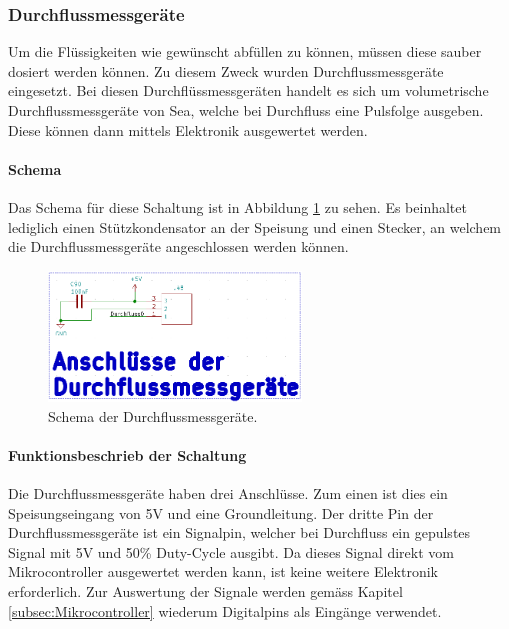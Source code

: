 \subsubsection{Durchflussmessgeräte}
\label{subsubsec:Durchflussmessgeraete}

Um die Flüssigkeiten wie gewünscht abfüllen zu können, müssen diese sauber dosiert werden können. Zu diesem Zweck wurden Durchflussmessgeräte eingesetzt. Bei diesen Durchflüssmessgeräten handelt es sich um volumetrische Durchflussmessgeräte von Sea, welche bei Durchfluss eine Pulsfolge ausgeben. Diese können dann mittels Elektronik ausgewertet werden. \cite{five__tools_store_us_nodate}

\paragraph{Schema}\mbox{}

Das Schema für diese Schaltung ist in Abbildung \ref{fig:Schema_Durchflussmessgeräte} zu sehen. Es beinhaltet lediglich einen Stützkondensator an der Speisung und einen Stecker, an welchem die Durchflussmessgeräte angeschlossen werden können.

\begin{figure}[h!]
	\centering
	\includegraphics[width=0.6\textwidth]{graphics/Schema_Durchflussmessgeraete.png}
	\caption{Schema der Durchflussmessgeräte.}
	\label{fig:Schema_Durchflussmessgeräte}
\end{figure}

\paragraph{Funktionsbeschrieb der Schaltung}\mbox{}

Die Durchflussmessgeräte haben drei Anschlüsse. Zum einen ist dies ein Speisungseingang von 5V und eine Groundleitung. Der dritte Pin der Durchflussmessgeräte ist ein Signalpin, welcher bei Durchfluss ein gepulstes Signal mit 5V und 50\% Duty-Cycle ausgibt. Da dieses Signal direkt vom Mikrocontroller ausgewertet werden kann, ist keine weitere Elektronik erforderlich. Zur Auswertung der Signale werden gemäss Kapitel \ref{subsec:Mikrocontroller} wiederum Digitalpins als Eingänge verwendet. \cite{five__tools_store_us_nodate}  